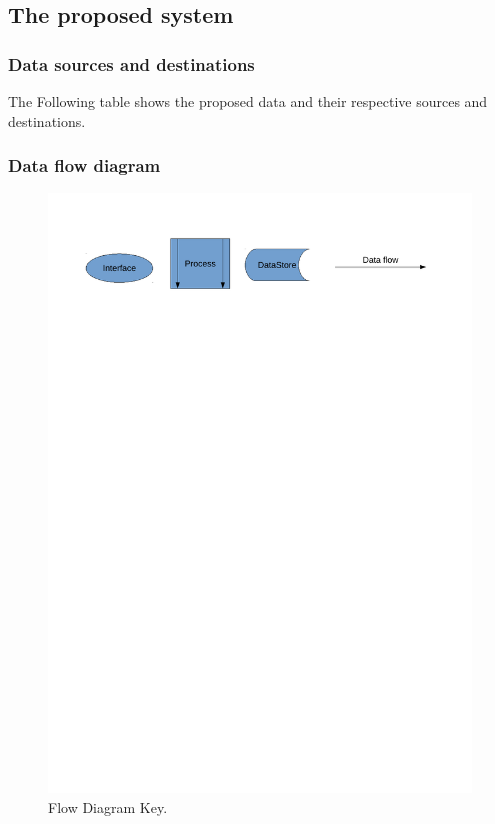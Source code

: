 \subsection{The proposed system}

\subsubsection{Data sources and destinations}

The Following table shows the proposed data and their respective sources and destinations.




\subsubsection{Data flow diagram}

\begin{figure}[H]
    \includegraphics[width=\textwidth]{./Analysis/Dataflow/DFD_analysis_key.pdf}
    \caption{Flow Diagram Key.} \label{fig:print_function_result}
\end{figure}

